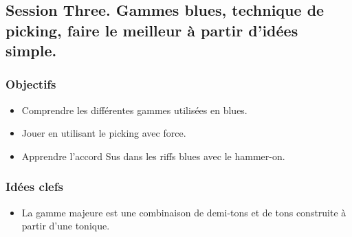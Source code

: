 \documentclass[a4paper]{book}
\begin{document}
\subsection{Session Three. Gammes blues, technique de picking, faire le meilleur à partir d'idées simple.}
\subsubsection{Objectifs}
\begin{itemize}
\item Comprendre les différentes gammes utilisées en blues.
\item Jouer en utilisant le picking avec force.
\item Apprendre l'accord Sus dans les riffs blues avec le hammer-on.
\end{itemize}
\subsubsection{Idées clefs}
\begin{itemize}
\item La gamme majeure est une combinaison de demi-tons et de tons construite à partir d'une tonique. 
\end{itemize}
\end{document}
